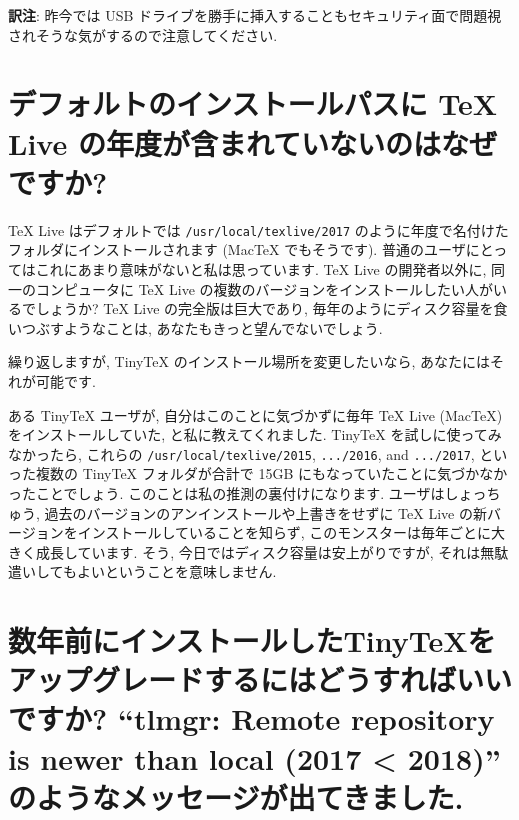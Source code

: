 \documentclass[
  xelatex,ja=standard,jafont=noto]{bxjsreport}
\begin{document}
\textbf{訳注}: 昨今では USB
ドライブを勝手に挿入することもセキュリティ面で問題視されそうな気がするので注意してください.

\hypertarget{ux30c7ux30d5ux30a9ux30ebux30c8ux306eux30a4ux30f3ux30b9ux30c8ux30fcux30ebux30d1ux30b9ux306b-tex-live-ux306eux5e74ux5ea6ux304cux542bux307eux308cux3066ux3044ux306aux3044ux306eux306fux306aux305cux3067ux3059ux304b}{%
\section{デフォルトのインストールパスに TeX Live
の年度が含まれていないのはなぜですか?}\label{ux30c7ux30d5ux30a9ux30ebux30c8ux306eux30a4ux30f3ux30b9ux30c8ux30fcux30ebux30d1ux30b9ux306b-tex-live-ux306eux5e74ux5ea6ux304cux542bux307eux308cux3066ux3044ux306aux3044ux306eux306fux306aux305cux3067ux3059ux304b}}

TeX Live はデフォルトでは \texttt{/usr/local/texlive/2017}
のように年度で名付けたフォルダにインストールされます (MacTeX
でもそうです).
普通のユーザにとってはこれにあまり意味がないと私は思っています. TeX Live
の開発者以外に, 同一のコンピュータに TeX Live
の複数のバージョンをインストールしたい人がいるでしょうか? TeX Live
の完全版は巨大であり, 毎年のようにディスク容量を食いつぶすようなことは,
あなたもきっと望んでないでしょう.

繰り返しますが, TinyTeX のインストール場所を変更したいなら,
あなたにはそれが可能です.

ある TinyTeX ユーザが, 自分はこのことに気づかずに毎年 TeX Live (MacTeX)
をインストールしていた, と私に教えてくれました. TinyTeX
を試しに使ってみなかったら, これらの \texttt{/usr/local/texlive/2015},
\texttt{.../2016}, and \texttt{.../2017}, といった複数の TinyTeX
フォルダが合計で 15GB にもなっていたことに気づかなかったことでしょう.
このことは私の推測の裏付けになります. ユーザはしょっちゅう,
過去のバージョンのアンインストールや上書きをせずに TeX Live
の新バージョンをインストールしていることを知らず,
このモンスターは毎年ごとに大きく成長しています. そう,
今日ではディスク容量は安上がりですが,
それは無駄遣いしてもよいということを意味しません.

\hypertarget{ux6570ux5e74ux524dux306bux30a4ux30f3ux30b9ux30c8ux30fcux30ebux3057ux305ftinytexux3092ux30a2ux30c3ux30d7ux30b0ux30ecux30fcux30c9ux3059ux308bux306bux306fux3069ux3046ux3059ux308cux3070ux3044ux3044ux3067ux3059ux304b-tlmgr-remote-repository-is-newer-than-local-2017-2018-ux306eux3088ux3046ux306aux30e1ux30c3ux30bbux30fcux30b8ux304cux51faux3066ux304dux307eux3057ux305f.}{%
\section{数年前にインストールしたTinyTeXをアップグレードするにはどうすればいいですか?
``tlmgr: Remote repository is newer than local (2017 \textless{} 2018)''
のようなメッセージが出てきました.}\label{ux6570ux5e74ux524dux306bux30a4ux30f3ux30b9ux30c8ux30fcux30ebux3057ux305ftinytexux3092ux30a2ux30c3ux30d7ux30b0ux30ecux30fcux30c9ux3059ux308bux306bux306fux3069ux3046ux3059ux308cux3070ux3044ux3044ux3067ux3059ux304b-tlmgr-remote-repository-is-newer-than-local-2017-2018-ux306eux3088ux3046ux306aux30e1ux30c3ux30bbux30fcux30b8ux304cux51faux3066ux304dux307eux3057ux305f.}}
\end{document}

